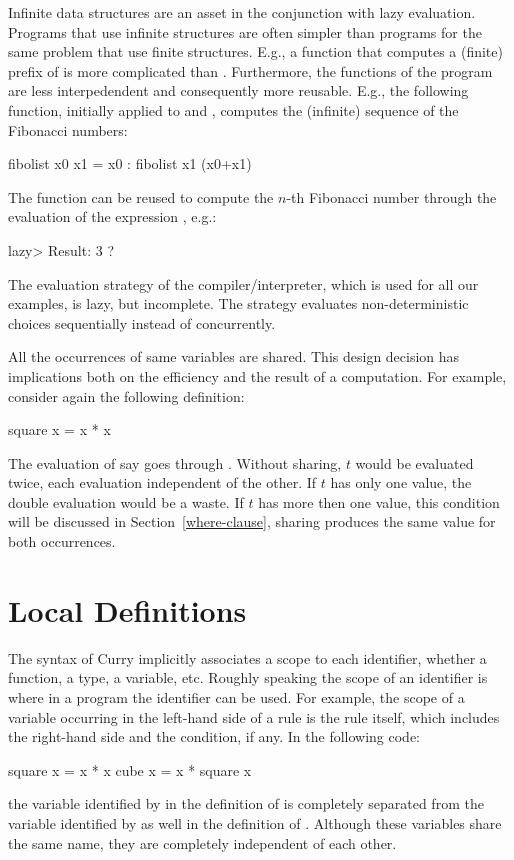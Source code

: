Infinite data structures
are an asset in the conjunction with lazy evaluation.
Programs that use infinite structures are often simpler
than programs for the same problem that use finite structures.
E.g., a function that computes a (finite) prefix of \ccode{[1,2,3,...}
is more complicated than .
Furthermore, the functions of the program are less interpedendent
and consequently more reusable.
E.g., the following function, initially applied to
 and , computes the (infinite) sequence of
the Fibonacci numbers:
%
\begin{prog}
fibolist x0 x1 = x0 : fibolist x1 (x0+x1)
\end{prog}
%
The function  can be reused to compute the $n$-th
Fibonacci number through the evaluation of the expression
, e.g.:
%
\begin{prog}
lazy> 
Result: 3 ? 
\end{prog}
%
The evaluation strategy of the \pakcs{} compiler/interpreter,
which is used for all our examples, is lazy, but incomplete.
The strategy evaluates non-deterministic choices sequentially instead
of concurrently.

All the occurrences of same variables are shared.
This design decision has implications both on the efficiency
and the result of a computation.
For example, consider again the following definition:
%
\begin{prog}
square x = x * x
\end{prog}
%
The evaluation of say  goes through
.  Without sharing, $t$ would be evaluated
twice, each evaluation independent of the other.
If $t$ has only one value, the double evaluation
would be a waste.
If $t$ has more then one value, this condition will be
discussed in Section~\ref{where-clause},
sharing produces the same value for both occurrences.

\section{Local Definitions}

The syntax of Curry implicitly associates a scope
to each identifier, whether a function, a type, a variable, etc.
Roughly speaking the scope of an identifier is where in a program
the identifier can be used.
For example, the scope of a variable occurring in the left-hand side
of a rule is the rule itself, which includes the right-hand side
and the condition, if any.
In the following code:
%
\begin{prog}
square x = x * x
cube   x = x * square x
\end{prog}
%
the variable identified by  in the definition of 
is completely separated from the variable 
identified by  as well in the definition of .
Although these variables share the same name, they
are completely independent of each other.

